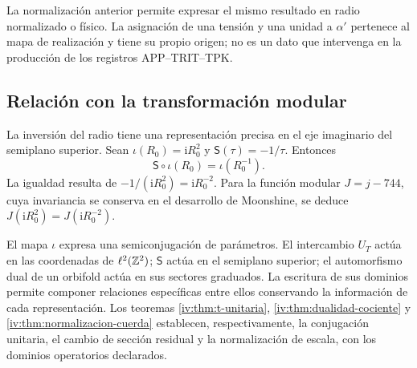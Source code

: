 La normalización anterior permite expresar el mismo resultado en
radio normalizado o físico. La asignación de una tensión y una
unidad a \(\alpha'\) pertenece al mapa de realización y tiene
su propio origen; no es un dato que intervenga en la producción
de los registros APP--TRIT--TPK.

\subsection{Relación con la transformación modular}

La inversión del radio tiene una representación precisa en el
eje imaginario del semiplano superior. Sean
\(\iota(R_0)=\mathrm iR_0^2\) y
\(\mathsf S(\tau)=-1/\tau\). Entonces
\begin{equation}
 \mathsf S\circ\iota(R_0)=\iota(R_0^{-1}).
 \label{iv:eq:semiconjugacion-modular}
\end{equation}
La igualdad resulta de
\(-1/(\mathrm iR_0^2)=\mathrm iR_0^{-2}\). Para la función
modular \(J=j-744\), cuya invariancia se conserva en el
desarrollo de Moonshine, se deduce
\(J(\mathrm iR_0^2)=J(\mathrm iR_0^{-2})\).

El mapa \(\iota\) expresa una semiconjugación de parámetros.
El intercambio \(U_T\) actúa en las coordenadas de
\(\ell^2(\mathbb Z^2)\); \(\mathsf S\) actúa en el semiplano
superior; el automorfismo dual de un orbifold actúa en sus
sectores graduados. La escritura de sus dominios permite
componer relaciones específicas entre ellos conservando la
información de cada representación. Los teoremas
\ref{iv:thm:t-unitaria}, \ref{iv:thm:dualidad-cociente}
y \ref{iv:thm:normalizacion-cuerda} establecen, respectivamente,
la conjugación unitaria, el cambio de sección residual y la
normalización de escala, con los dominios operatorios declarados.
